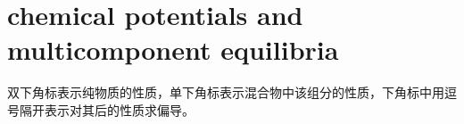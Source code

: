 \ifx\allfiles\undefined
{}  %
\usepackage[dvipsnames]{xcolor}
\usepackage{amsmath}   %
\usepackage{graphicx}
\usetikzlibrary{arrows, calc, decorations.pathmorphing}
\allowdisplaybreaks %
\newcommand{\pa}{\partial}
\newcommand{\mathminus}{\!\!-\!\!} %
\newcommand{\vsup}[1]{\raisebox{-0.1ex}{$\scriptstyle #1$}}
\newcommand{\lsup}[1]{\raisebox{-0.85ex}{$\scriptstyle #1$}}



\else
\fi
\chapter{chemical potentials and multicomponent equilibria}
\begin{zhu}
    双下角标表示纯物质的性质，单下角标表示混合物中该组分的性质，下角标中用逗号隔开表示对其后的性质求偏导。
\end{zhu}

